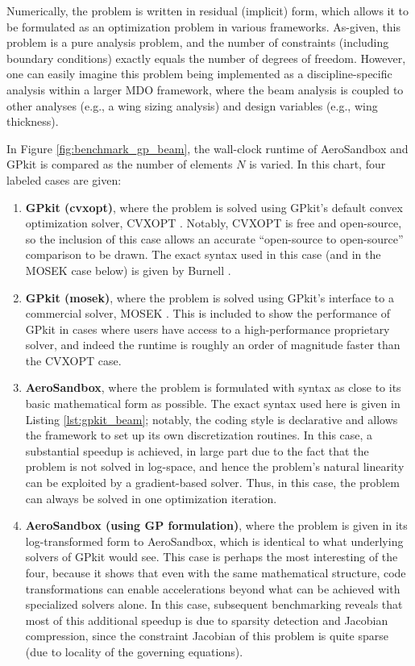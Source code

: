 Numerically, the problem is written in residual (implicit) form, which allows it to be formulated as an optimization problem in various frameworks. As-given, this problem is a pure analysis problem, and the number of constraints (including boundary conditions) exactly equals the number of degrees of freedom. However, one can easily imagine this problem being implemented as a discipline-specific analysis within a larger MDO framework, where the beam analysis is coupled to other analyses (e.g., a wing sizing analysis) and design variables (e.g., wing thickness).

In Figure \ref{fig:benchmark_gp_beam}, the wall-clock runtime of AeroSandbox and GPkit is compared as the number of elements $N$ is varied. In this chart, four labeled cases are given:
\begin{enumerate}
    \item \textbf{GPkit (cvxopt)}, where the problem is solved using GPkit's default convex optimization solver, CVXOPT \cite{cvxopt}. Notably, CVXOPT is free and open-source, so the inclusion of this case allows an accurate ``open-source to open-source'' comparison to be drawn. The exact syntax used in this case (and in the MOSEK case below) is given by Burnell \cite{gpkit_beam}.
    \item \textbf{GPkit (mosek)}, where the problem is solved using GPkit's interface to a commercial solver, MOSEK \cite{mosek}. This is included to show the performance of GPkit in cases where users have access to a high-performance proprietary solver, and indeed the runtime is roughly an order of magnitude faster than the CVXOPT case.
    \item \textbf{AeroSandbox}, where the problem is formulated with syntax as close to its basic mathematical form as possible. The exact syntax used here is given in Listing \ref{lst:gpkit_beam}; notably, the coding style is declarative and allows the framework to set up its own discretization routines. In this case, a substantial speedup is achieved, in large part due to the fact that the problem is not solved in log-space, and hence the problem's natural linearity can be exploited by a gradient-based solver. Thus, in this case, the problem can always be solved in one optimization iteration.
    \item \textbf{AeroSandbox (using GP formulation)}, where the problem is given in its log-transformed form to AeroSandbox, which is identical to what underlying solvers of GPkit would see. This case is perhaps the most interesting of the four, because it shows that even with the same mathematical structure, code transformations can enable accelerations beyond what can be achieved with specialized solvers alone. In this case, subsequent benchmarking reveals that most of this additional speedup is due to sparsity detection and Jacobian compression, since the constraint Jacobian of this problem is quite sparse (due to locality of the governing equations).
\end{enumerate}

